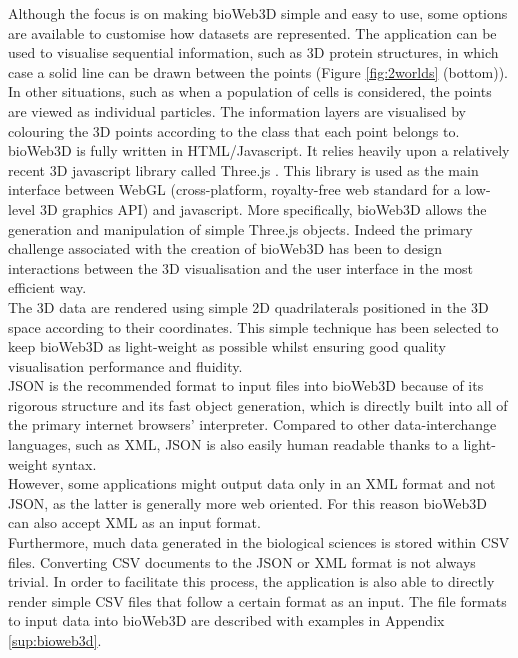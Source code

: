 Although the focus is on making bioWeb3D simple and easy to use, some options are available to customise how datasets are represented. The application can be used to visualise sequential information, such as 3D protein structures, in which case a solid line can be drawn between the points (Figure \ref{fig:2worlds} (bottom)). In other situations, such as when a population of cells is considered, the points are viewed as individual particles. The information layers are visualised by colouring the 3D points according to the class that each point belongs to. \\

bioWeb3D is fully written in HTML/Javascript. It relies heavily upon a relatively recent 3D javascript library called Three.js \cite{three}. This library is used as the main interface between WebGL (cross-platform, royalty-free web standard for a low-level 3D graphics API) \cite{webgl} and javascript. More specifically, bioWeb3D allows the generation and manipulation of simple Three.js objects. Indeed the primary challenge associated with the creation of bioWeb3D has been to design interactions between the 3D visualisation and the user interface in the most efficient way.\\

The 3D data are rendered using simple 2D quadrilaterals positioned in the 3D space according to their coordinates. This simple technique has been selected to keep bioWeb3D as light-weight as possible whilst ensuring good quality visualisation performance and fluidity.\\


JSON is the recommended format to input files into bioWeb3D because of its rigorous structure and its fast object generation, which is directly built into all of the primary internet browsers' interpreter. Compared to other data-interchange languages, such as XML, JSON is also easily human readable thanks to a light-weight syntax.\\

However, some applications might output data only in an XML format and not JSON, as the latter is generally more web oriented. For this reason bioWeb3D can also accept XML as an input format.\\

Furthermore, much data generated in the biological sciences is stored within CSV files. Converting CSV documents to the JSON or XML format is not always trivial. In order to facilitate this process, the application is also able to directly render simple CSV files that follow a certain format as an input. The file formats to input data into bioWeb3D are described with examples in Appendix \ref{sup:bioweb3d}.

